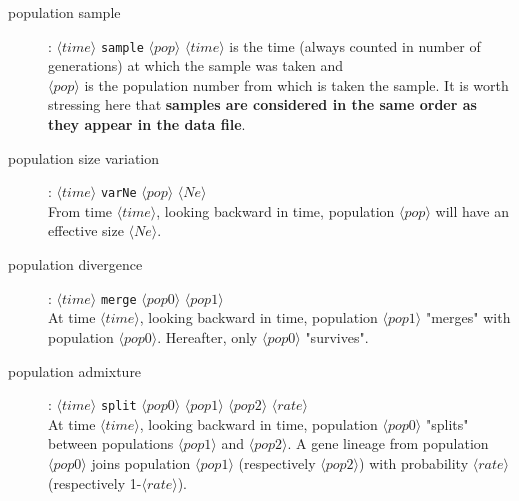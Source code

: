 \begin{description}
\item[population sample] : $\langle time \rangle$ \texttt{sample} $\langle pop \rangle$  %
$\langle time \rangle$ is the time (always counted in number of generations) at which the sample was taken and\\
 $\langle pop \rangle$ is the population number from which is taken the sample. It is worth stressing here that \textbf{samples are considered
in the same order as they appear in the data file}.\\
 

\item[population size variation] : $\langle time \rangle$ \texttt{varNe}
 $\langle pop \rangle$ $\langle Ne \rangle$\\
 From time $\langle time \rangle$, looking backward in time,
 population $\langle pop \rangle$ will have an effective size $\langle Ne
 \rangle$.
\item[population divergence] :
$\langle time \rangle$ \texttt{merge} $\langle pop0 \rangle$
$\langle pop1 \rangle$\\
At time $\langle time \rangle$, looking backward in time, population
$\langle pop1 \rangle$ "merges" with population $\langle pop0
\rangle$. Hereafter, only $\langle pop0 \rangle$ "survives".
\item[population admixture] :
$\langle time \rangle$ \texttt{split} $\langle pop0 \rangle$
$\langle pop1 \rangle$ $\langle pop2 \rangle$ $\langle rate \rangle$\\
At time $\langle time \rangle$, looking backward in time, population
$\langle pop0 \rangle$ "splits" between populations $\langle pop1
\rangle$ and $\langle pop2 \rangle$. A gene lineage from population
$\langle pop0 \rangle$ joins population $\langle pop1 \rangle$
(respectively $\langle pop2 \rangle$) with probability $\langle rate
\rangle$ (respectively 1-$\langle rate \rangle$).
\end{description}

